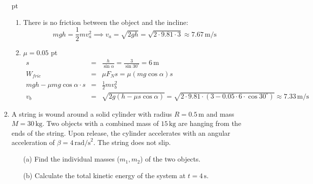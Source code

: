\documentclass[a4paper,12pt]{letter}
\begin{document}
\begin{enumerate}
\begin{center}
\end{center}

 pt
\begin{enumerate}
\item There is no friction between the object and the incline: $$mgh = \frac{1}{2}mv_a^2 \implies v_a = \sqrt{2gh} = \sqrt{2 \cdot 9.81 \cdot 3} \approx 7.67\,\text{m/s}$$
\item $\mu=0.05$
 pt
\begin{eqnarray*}
s &=& \frac{h}{\sin\alpha} = \frac{3}{\sin 30^\circ} = 6\,\text{m}  \\
W_{fric} &=& \mu F_N s = \mu (mg \cos\alpha) s  \\
mgh - \mu mg \cos\alpha \cdot s &=& \frac{1}{2}mv_b^2  \\
v_b &=& \sqrt{2g(h - \mu s \cos\alpha)} = \sqrt{2 \cdot 9.81 \cdot (3 - 0.05 \cdot 6 \cdot \cos 30^\circ)} \approx 7.33\,\text{m/s} 
\end{eqnarray*}
\end{enumerate}



\item A string is wound around a solid cylinder with radius $R = 0.5\,\text{m}$ and mass $M = 30\,\text{kg}$. Two objects with a combined mass of $15\,\text{kg}$ are hanging from the ends of the string. Upon release, the cylinder accelerates with an angular acceleration of $\beta = 4\,\text{rad/s}^2$. The string does not slip.
\begin{itemize}
    \item[(a)] Find the individual masses ($m_1, m_2$) of the two objects.
    \item[(b)] Calculate the total kinetic energy of the system at $t = 4\,\text{s}$.
\end{itemize}


\end{enumerate}
\end{document}
